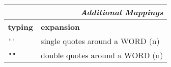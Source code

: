\documentclass[oneside,12pt,a4paper,DIV18]{scrartcl}
\begin{document}
\begin{center}
\begin{minipage}[b]{70mm}
\begin{spacing}{1.2}%
\begin{tabular}[]{|p{11mm}|p{55mm}|}%
\hline
\multicolumn{2}{|r|}{\textsl{Additional Mappings}}\\
\hline
\hline \textbf{typing}& \textbf{expansion}\\
\hline \verb"''"      & single quotes around a WORD    \hfill (n)\\
\hline \verb'""'      & double quotes around a WORD    \hfill (n)\\
\hline
\end{tabular}
\end{spacing}
\end{minipage}%
%
\end{center}
\end{document}
